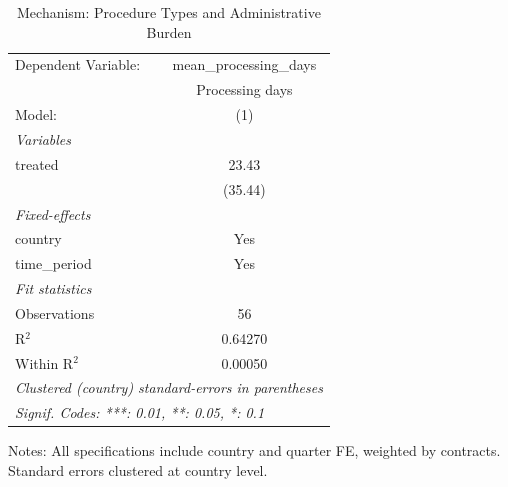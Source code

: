 
\begin{table}[htbp]
   \caption{\label{tab:mechanism} Mechanism: Procedure Types and Administrative Burden}
   \centering
   \begin{tabular}{lc}
      \tabularnewline \midrule \midrule
      Dependent Variable: & mean\_processing\_days\\    
                          & Processing days \\   
      Model:              & (1)\\  
      \midrule
      \emph{Variables}\\
      treated             & 23.43\\   
                          & (35.44)\\   
      \midrule
      \emph{Fixed-effects}\\
      country             & Yes\\  
      time\_period        & Yes\\  
      \midrule
      \emph{Fit statistics}\\
      Observations        & 56\\  
      R$^2$               & 0.64270\\  
      Within R$^2$        & 0.00050\\  
      \midrule \midrule
      \multicolumn{2}{l}{\emph{Clustered (country) standard-errors in parentheses}}\\
      \multicolumn{2}{l}{\emph{Signif. Codes: ***: 0.01, **: 0.05, *: 0.1}}\\
   \end{tabular}
   
   \par \raggedright 
   Notes: All specifications include country and quarter FE, weighted by contracts. Standard errors clustered at country level.
\end{table}


